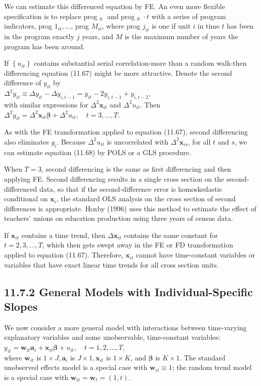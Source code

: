 \documentclass[10pt]{article}
\begin{document}
We can estimate this differenced equation by FE. An even more flexible specification is to replace prog $_{\text {it }}$ and prog $_{\text {it }} \cdot t$ with a series of program indicators, prog $1_{i t}, \ldots$, prog $M_{i t}$, where prog $j_{i t}$ is one if unit $i$ in time $t$ has been in the program exactly $j$ years, and $M$ is the maximum number of years the program has been around.

If $\left\{u_{i t}\right\}$ contains substantial serial correlation-more than a random walk-then differencing equation (11.67) might be more attractive. Denote the second difference of $y_{i t}$ by\\
$\Delta^{2} y_{i t} \equiv \Delta y_{i t}-\Delta y_{i, t-1}=y_{i t}-2 y_{i, t-1}+y_{i, t-2}$,\\
with similar expressions for $\Delta^{2} \mathbf{x}_{i t}$ and $\Delta^{2} u_{i t}$. Then\\
$\Delta^{2} y_{i t}=\Delta^{2} \mathbf{x}_{i t} \boldsymbol{\beta}+\Delta^{2} u_{i t}, \quad t=3, \ldots, T$.

As with the FE transformation applied to equation (11.67), second differencing also eliminates $g_{i}$. Because $\Delta^{2} u_{i t}$ is uncorrelated with $\Delta^{2} \mathbf{x}_{i s}$, for all $t$ and $s$, we can estimate equation (11.68) by POLS or a GLS procedure.

When $T=3$, second differencing is the same as first differencing and then applying FE. Second differencing results in a single cross section on the second-differenced data, so that if the second-difference error is homoskedastic conditional on $\mathbf{x}_{i}$, the standard OLS analysis on the cross section of second differences is appropriate. Hoxby (1996) uses this method to estimate the effect of teachers' unions on education production using three years of census data.

If $\mathbf{x}_{i t}$ contains a time trend, then $\Delta \mathbf{x}_{i t}$ contains the same constant for $t= 2,3, \ldots, T$, which then gets swept away in the FE or FD transformation applied to equation (11.67). Therefore, $\mathbf{x}_{i t}$ cannot have time-constant variables or variables that have exact linear time trends for all cross section units.

\subsection*{11.7.2 General Models with Individual-Specific Slopes}
We now consider a more general model with interactions between time-varying explanatory variables and some unobservable, time-constant variables:\\
$y_{i t}=\mathbf{w}_{i t} \mathbf{a}_{i}+\mathbf{x}_{i t} \boldsymbol{\beta}+u_{i t}, \quad t=1,2, \ldots, T$,\\
where $\mathbf{w}_{i t}$ is $1 \times J, \mathbf{a}_{i}$ is $J \times 1, \mathbf{x}_{i t}$ is $1 \times K$, and $\boldsymbol{\beta}$ is $K \times 1$. The standard unobserved effects model is a special case with $\mathbf{w}_{i t} \equiv 1$; the random trend model is a special case with $\mathbf{w}_{i t}=\mathbf{w}_{t}=(1, t)$.
\end{document}
